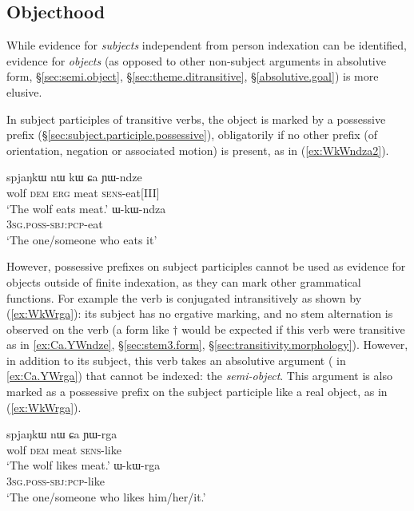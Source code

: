  \subsection{Objecthood}
 While evidence for \textit{subjects} independent from person indexation can be identified, evidence for \textit{objects} (as opposed to other non-subject arguments in absolutive form, §\ref{sec:semi.object}, §\ref{sec:theme.ditransitive}, §\ref{absolutive.goal}) is more elusive. 
 
In subject participles of transitive verbs, the object is marked by a possessive prefix  (§\ref{sec:subject.participle.possessive}), obligatorily if no other prefix (of orientation, negation or associated motion) is present, as in (\ref{ex:WkWndza2}).  

\begin{exe} 
\ex 
\begin{xlist}
\ex \label{ex:Ca.YWndze}
\gll spjaŋkɯ nɯ kɯ ɕa ɲɯ-ndze \\
wolf \textsc{dem} \textsc{erg} meat \textsc{sens}-eat[III] \\
\glt `The wolf eats meat.' 
\ex \label{ex:WkWndza2}
\gll ɯ-kɯ-ndza  \\
\textsc{3sg}.\textsc{poss}-\textsc{sbj}:\textsc{pcp}-eat \\
\glt `The one/someone who eats it' 
\end{xlist}
\end{exe}

However, possessive prefixes on subject participles cannot be used as evidence for objects outside of finite indexation, as they can mark other grammatical functions. For example the verb  is conjugated intransitively as shown by (\ref{ex:WkWrga}): its subject  has no ergative marking, and no stem alternation is observed on the verb (a form like $\dagger$ would be expected if this verb were transitive as in \ref{ex:Ca.YWndze}, §\ref{sec:stem3.form}, §\ref{sec:transitivity.morphology}). However, in addition to its subject, this verb takes an absolutive argument ( in \ref{ex:Ca.YWrga}) that cannot be indexed: the \textit{semi-object}. This argument is also marked as a possessive prefix on the subject participle like a real object, as in (\ref{ex:WkWrga}).
 
\begin{exe} 
\ex 
\begin{xlist}
\ex \label{ex:Ca.YWrga}
\gll spjaŋkɯ nɯ ɕa ɲɯ-rga \\
wolf \textsc{dem} meat \textsc{sens}-like \\
\glt `The wolf likes meat.' 
\ex \label{ex:WkWrga}
\gll ɯ-kɯ-rga  \\
\textsc{3sg}.\textsc{poss}-\textsc{sbj}:\textsc{pcp}-like \\
\glt `The one/someone who likes him/her/it.' 
\end{xlist}
\end{exe}
 
